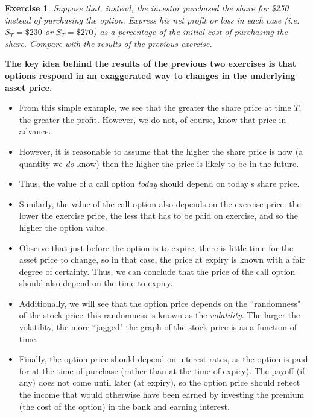 \documentclass[letterpaper,10pt]{article}
\newtheorem{ex}{Exercise}
\begin{document}
\begin{ex}
Suppose that, instead, the investor purchased the share for \$250 instead of purchasing the option.  Express his net profit or loss in each case (i.e. $S_T=\$230$ or $S_T=\$270$) as a percentage of the initial cost of purchasing the share.  Compare with the results of the previous exercise.
\end{ex}  

\begin{center} {\bf The key idea behind the results of the previous two exercises is that options respond in an exaggerated way to changes in the underlying asset price.}
\end{center}

\begin{itemize}

\item From this simple example, we see that the greater the share price at time $T$, the greater the profit.  However, we do not, of course, know that price in advance.  

\item However, it is reasonable to assume that the higher the share price is now (a quantity we {\em do} know) then the higher the price is likely to be in the future.  

\item Thus, the value of a call option {\em today} should depend on today's share price.  

\item Similarly, the value of the call option also depends on the exercise price:  the lower the exercise price, the less that has to be paid on exercise, and so the higher the option value.  

\item Observe that just before the option is to expire, there is little time for the asset price to change, so in that case, the price at expiry is known with a fair degree of certainty.  Thus, we can conclude that the price of the call option should also depend on the time to expiry.

\item Additionally, we will see that the option price depends on the ``randomness" of the stock price--this randomness is known as the {\em volatility}.  The larger the volatility, the more ``jagged" the graph of the stock price is as a function of time.  

\item Finally, the option price should depend on interest rates, as the option is paid for at the time of purchase (rather than at the time of expiry).  The payoff (if any) does not come until later (at expiry), so the option price should reflect the income that would otherwise have been earned by investing the premium (the cost of the option) in the bank and earning interest.  

\end{itemize}
\end{document}
